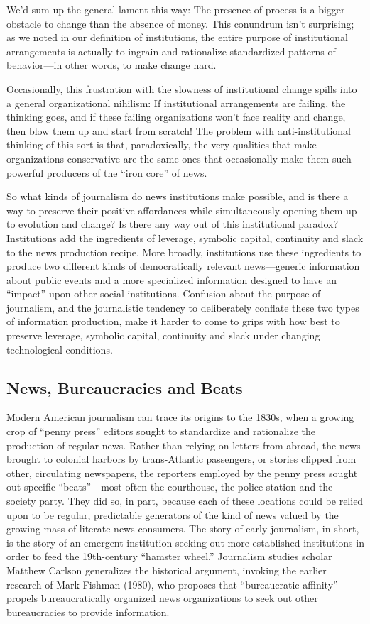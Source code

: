We’d sum up the general lament this way: The presence of process is a bigger
obstacle to change than the absence of money. This conundrum isn’t surprising;
as we noted in our definition of institutions, the entire purpose of institutional
arrangements is actually to ingrain and rationalize standardized patterns of
behavior—in other words, to make change hard.

Occasionally, this frustration with the slowness of institutional change spills into
a general organizational nihilism: If institutional arrangements are failing, the
thinking goes, and if these failing organizations won’t face reality and change,
then blow them up and start from scratch! The problem with anti-institutional
thinking of this sort is that, paradoxically, the very qualities that make organizations
conservative are the same ones that occasionally make them such powerful
producers of the ``iron core'' of news.

So what kinds of journalism do news institutions make possible, and is there a way
to preserve their positive affordances while simultaneously opening them up to
evolution and change? Is there any way out of this institutional paradox? Institutions
add the ingredients of leverage, symbolic capital, continuity and slack to the
news production recipe. More broadly, institutions use these ingredients to produce
two different kinds of democratically relevant news—generic information about
public events and a more specialized information designed to have an ``impact''
upon other social institutions. Confusion about the purpose of journalism, and
the journalistic tendency to deliberately conflate these two types of information
production, make it harder to come to grips with how best to preserve leverage,
symbolic capital, continuity and slack under changing technological conditions.

\subsection{News, Bureaucracies and Beats}

Modern American journalism can trace its origins to the 1830s, when a growing
crop of ``penny press'' editors sought to standardize and rationalize the production
of regular news. Rather than relying on letters from abroad, the news brought
to colonial harbors by trans-Atlantic passengers, or stories clipped from other,
circulating newspapers, the reporters employed by the penny press sought out specific ``beats''—most often the courthouse, the police station and the society
party. They did so, in part, because each of these locations could be relied upon to
be regular, predictable generators of the kind of news valued by the growing mass
of literate news consumers. The story of early journalism, in short, is the story of
an emergent institution seeking out more established institutions in order to feed
the 19th-century ``hamster wheel.'' Journalism studies scholar Matthew Carlson
generalizes the historical argument, invoking the earlier research of Mark Fishman
(1980), who proposes that ``bureaucratic affinity'' propels bureaucratically organized
news organizations to seek out other bureaucracies to provide information.

